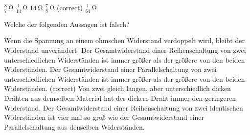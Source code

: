 \documentclass[11pt]{exam}
\begin{document}
\begin{questions}
\begin{choices}
	\choice \(\mathrm{\frac{8}{7}\,\Omega}\)
	\choice \(\mathrm{\frac{1}{14}\,\Omega}\)
	\choice \(\mathrm{14\,\Omega}\)
	\choice \(\mathrm{\frac{7}{8}\,\Omega}\) (correct)
	\choice \(\mathrm{\frac{1}{64}\,\Omega}\)
\end{choices}

\vspace{3mm}\question Welche der folgenden Aussagen ist falsch?

\begin{choices}
	\choice Wenn die Spannung an einem ohmschen Widerstand verdoppelt wird, bleibt der Widerstand unverändert.
	\choice Der Gesamtwiderstand einer Reihenschaltung von zwei unterschiedlichen Widerständen ist immer größer als der größere von den beiden Widerständen.
	\choice Der Gesamtwiderstand einer Parallelschaltung von zwei unterschiedlichen Widerständen ist immer größer als der größere von den beiden Widerständen. (correct)
	\choice Von zwei gleich langen, aber unterschiedlich dicken Drähten aus demselben Material hat der dickere Draht immer den geringeren Widerstand.
	\choice Der Gesamtwiderstand einer Reihenschaltung von zwei identischen Widerständen ist vier mal so groß wie der Gesamtwiderstand einer Parallelschaltung aus denselben Widerständen.
\end{choices}

\vspace{3mm}\end{questions}
\end{document}
